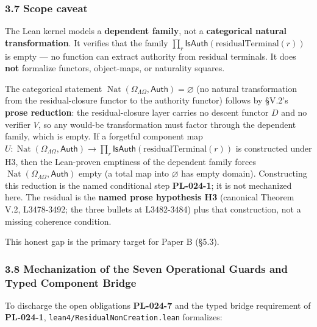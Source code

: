 \documentclass[
  10pt,
]{article}
\DeclareRobustCommand{\texttt}[1]{{\paperSymbolFont\nolinkurl{#1}}}
\begin{document}
\subsubsection{3.7 Scope caveat}\label{scope-caveat}

The Lean kernel models a \textbf{dependent family}, not a \textbf{categorical natural transformation}. It verifies that the family \protect\hypertarget{math-E0056-0084}{}{\(\prod_r \mathsf{IsAuth}(\mathrm{residualTerminal}(r))\)} is empty --- no function can extract authority from residual terminals. It does \textbf{not} formalize functors, object-maps, or naturality squares.

The categorical statement \protect\hypertarget{math-E0003-0085}{}{\(\operatorname{Nat}(\Omega_{\Lambda\Omega}, \mathsf{Auth}) = \varnothing\)} (no natural transformation from the residual-closure functor to the authority functor) follows by §V.2's \textbf{prose reduction}: the residual-closure layer carries no descent functor \protect\hypertarget{math-E0060-0086}{}{\(D\)} and no verifier \protect\hypertarget{math-E0061-0087}{}{\(V\)}, so any would-be transformation must factor through the dependent family, which is empty. If a forgetful component map \protect\hypertarget{math-E0062-0088}{}{\(U : \operatorname{Nat}(\Omega_{\Lambda\Omega}, \mathsf{Auth}) \to \prod_r \mathsf{IsAuth}(\mathrm{residualTerminal}(r))\)} is constructed under H3, then the Lean-proven emptiness of the dependent family forces \protect\hypertarget{math-E0063-0089}{}{\(\operatorname{Nat}(\Omega_{\Lambda\Omega}, \mathsf{Auth})\)} empty (a total map into \protect\hypertarget{math-E0064-0090}{}{\(\varnothing\)} has empty domain). Constructing this reduction is the named conditional step \textbf{PL-024-1}; it is not mechanized here. The residual is the \textbf{named prose hypothesis H3} (canonical Theorem V.2, L3478-3492; the three bullets at L3482-3484) plus that construction, not a missing coherence condition.

This honest gap is the primary target for Paper B (§5.3).

\subsubsection{3.8 Mechanization of the Seven Operational Guards and Typed Component Bridge}\label{mechanization-of-the-seven-operational-guards-and-typed-component-bridge}

To discharge the open obligations \textbf{PL-024-7} and the typed bridge requirement of \textbf{PL-024-1}, \texttt{lean4/ResidualNonCreation.lean} formalizes:
\end{document}
